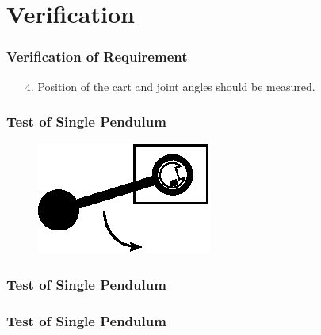 \documentclass[mathserif]{beamer}
\begin{document}
\section{Verification}

\begin{frame}[c]\frametitle{Verification of Requirement}
	\begin{enumerate}
		\item[4.] \alert{Position of the cart and joint angles should be measured.}
	\end{enumerate}
\end{frame}

\begin{frame}[c]\frametitle{Test of Single Pendulum}
    \begin{figure}[h]
		\centering
		\includegraphics[width=.5\linewidth]{graphics/single_pendulum}
	\end{figure}
\end{frame}

\begin{frame}[c]\frametitle{Test of Single Pendulum}
    \begin{figure}[h]
		\centering
		
	\end{figure}
\end{frame}

\begin{frame}[c]\frametitle{Test of Single Pendulum}
    \begin{figure}[h]
		\centering
		
	\end{figure}
\end{frame}
\end{document}
